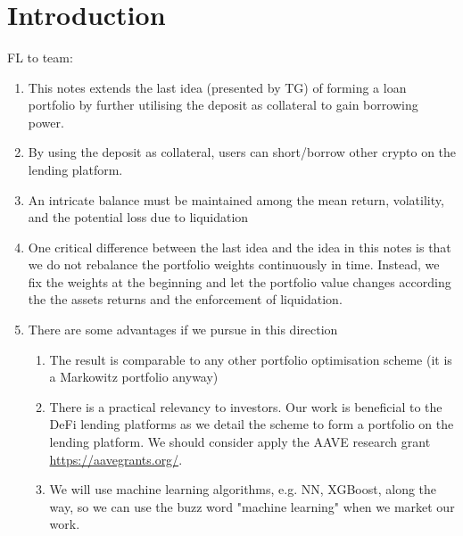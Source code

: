 \documentclass{article} %
\theoremstyle{plain}
\theoremstyle{definition} %
\begin{document}
\setlength{\boxlength}{0.95\textwidth} %
\title{\large{\bf{}}} %
\author{{\normalsize\bf{}}}%
\thispagestyle{empty}
\addtocounter{page}{1}
\maketitle

\vspace{.5cm}
\def\contentsname{Contents}
\tableofcontents
\vspace{.5cm}

\section{Introduction}
FL to team: 
\begin{enumerate}
  \item This notes extends the last idea (presented by TG) of forming a loan portfolio by further utilising the deposit as collateral to gain borrowing power.
  \item By using the deposit as collateral, users can short/borrow other crypto on the lending platform.
  \item An intricate balance must be maintained among the mean return, volatility, and the potential loss due to liquidation
  \item One critical difference between the last idea and the idea in this notes is that we do not rebalance the portfolio weights continuously in time.
  Instead, we fix the weights at the beginning and let the portfolio value changes according the the assets returns and the enforcement of liquidation. 
  \item There are some advantages if we pursue in this direction
  \begin{enumerate}
    \item The result is comparable to any other portfolio optimisation scheme (it is a Markowitz portfolio anyway)
    \item There is a practical relevancy to investors. Our work is beneficial to the DeFi lending platforms as we detail the scheme to form a portfolio on the lending platform. 
    We should consider apply the AAVE research grant \url{https://aavegrants.org/}.
    \item We will use machine learning algorithms, e.g. NN, XGBoost, along the way, so we can use the buzz word "machine learning" when we market our work. 
  \end{enumerate}
\end{enumerate}
\end{document}
